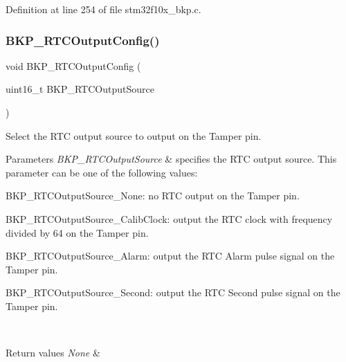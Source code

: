 Definition at line 254 of file stm32f10x\+\_\+bkp.\+c.

\mbox{\label{group___b_k_p___private___functions_ga3d1b22b3c6a79f7b423616a0af1885bf}} 
\subsubsection{\texorpdfstring{B\+K\+P\+\_\+\+R\+T\+C\+Output\+Config()}{BKP\_RTCOutputConfig()}}
{\footnotesize\ttfamily void B\+K\+P\+\_\+\+R\+T\+C\+Output\+Config (\begin{DoxyParamCaption}\item[{uint16\+\_\+t}]{B\+K\+P\+\_\+\+R\+T\+C\+Output\+Source }\end{DoxyParamCaption})}



Select the R\+TC output source to output on the Tamper pin. 


\begin{DoxyParams}{Parameters}
{\em B\+K\+P\+\_\+\+R\+T\+C\+Output\+Source} & specifies the R\+TC output source. This parameter can be one of the following values\+: \begin{DoxyItemize}
\item B\+K\+P\+\_\+\+R\+T\+C\+Output\+Source\+\_\+\+None\+: no R\+TC output on the Tamper pin. \item B\+K\+P\+\_\+\+R\+T\+C\+Output\+Source\+\_\+\+Calib\+Clock\+: output the R\+TC clock with frequency divided by 64 on the Tamper pin. \item B\+K\+P\+\_\+\+R\+T\+C\+Output\+Source\+\_\+\+Alarm\+: output the R\+TC Alarm pulse signal on the Tamper pin. \item B\+K\+P\+\_\+\+R\+T\+C\+Output\+Source\+\_\+\+Second\+: output the R\+TC Second pulse signal on the Tamper pin. \end{DoxyItemize}
\\
\hline
\end{DoxyParams}

\begin{DoxyRetVals}{Return values}
{\em None} & \\
\hline
\end{DoxyRetVals}


